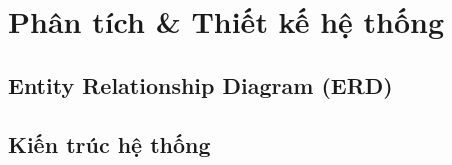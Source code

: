 \section{Phân tích \& Thiết kế hệ thống}
\subsection{Entity Relationship Diagram (ERD)}
\subsection{Kiến trúc hệ thống}